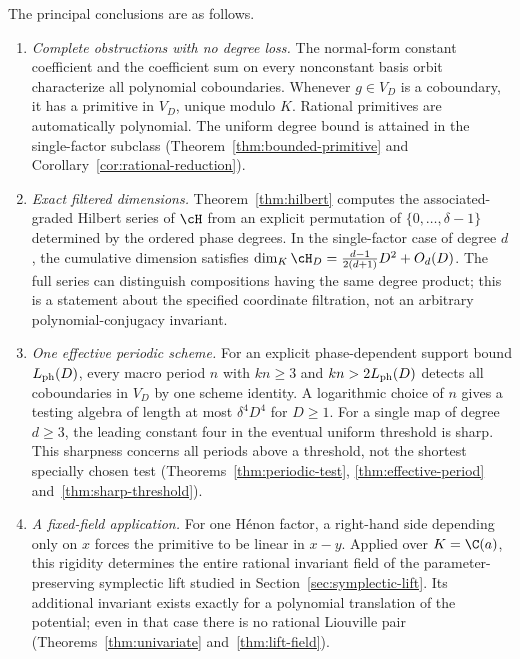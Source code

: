 The principal conclusions are as follows.
\begin{enumerate}
\item \emph{Complete obstructions with no degree loss.}
The normal-form constant coefficient and the coefficient sum on every
nonconstant basis orbit characterize all polynomial coboundaries.
Whenever $g\in V_D$ is a coboundary, it has a primitive in $V_D$, unique
modulo $K$. Rational primitives are automatically polynomial.
The uniform degree bound is attained in the single-factor subclass
(Theorem~\ref{thm:bounded-primitive} and
Corollary~\ref{cor:rational-reduction}).

\item \emph{Exact filtered dimensions.}
Theorem~\ref{thm:hilbert} computes the associated-graded Hilbert series of
$\cH$ from an explicit permutation of $\{0,\ldots,\delta-1\}$ determined
by the ordered phase degrees. In the single-factor case of degree $d$,
the cumulative dimension satisfies
$\dim_K\cH_D=\frac{d-1}{2(d+1)}D^2+O_d(D)$.
The full series can distinguish compositions having the same degree
product; this is a statement about the specified coordinate filtration,
not an arbitrary polynomial-conjugacy invariant.

\item \emph{One effective periodic scheme.}
For an explicit phase-dependent support bound $L_{\rm ph}(D)$, every
macro period $n$ with $kn\ge3$ and $kn>2L_{\rm ph}(D)$ detects all
coboundaries in $V_D$ by one scheme identity. A logarithmic choice of
$n$ gives a testing algebra of length at most $\delta^4D^4$ for $D\ge1$.
For a single map of degree $d\ge3$, the leading constant four in the
eventual uniform threshold is sharp. This sharpness concerns all periods
above a threshold, not the shortest specially chosen test
(Theorems~\ref{thm:periodic-test}, \ref{thm:effective-period}
and~\ref{thm:sharp-threshold}).

\item \emph{A fixed-field application.}
For one H\'enon factor, a right-hand side depending only on $x$ forces
the primitive to be linear in $x-y$. Applied over $K=\C(a)$, this
rigidity determines the entire rational invariant field of the
parameter-preserving symplectic lift studied in
Section~\ref{sec:symplectic-lift}. Its additional invariant exists
exactly for a polynomial translation of the potential; even in that
case there is no rational Liouville pair
(Theorems~\ref{thm:univariate} and~\ref{thm:lift-field}).
\end{enumerate}

